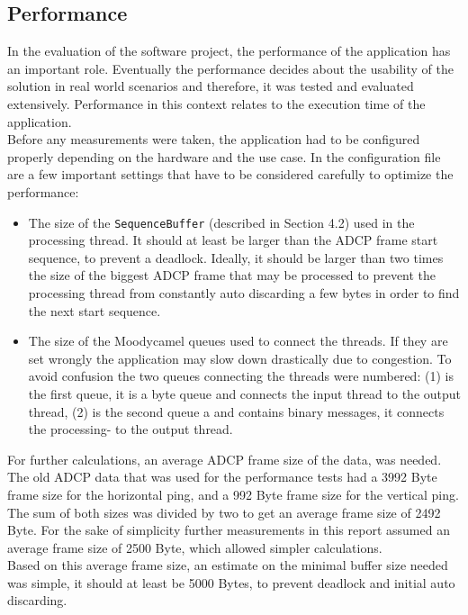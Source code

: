 \subsection{Performance}
In the evaluation of the software project, the performance of the application has an important role. Eventually the performance decides about the usability of the solution in real world scenarios and therefore, it was tested and evaluated extensively. Performance in this context relates to the execution time of the application.\\
Before any measurements were taken, the application had to be configured properly depending on the hardware and the use case. In the configuration file are a few important settings that have to be considered carefully to optimize the performance:
\begin{itemize}
\item The size of the \texttt{SequenceBuffer} (described in Section 4.2) used in the processing thread. It should at least be larger than the ADCP frame start sequence, to prevent a deadlock. Ideally, it should be larger than two times the size of the biggest ADCP frame that may be processed to prevent the processing thread from constantly auto discarding a few bytes in order to find the next start sequence.
\item The size of the Moodycamel queues used to connect the threads. If they are set wrongly the application may slow down drastically due to congestion. To avoid confusion the two queues connecting the threads were numbered: (1) is the first queue, it is a byte queue and connects the input thread to the output thread, (2) is the second queue a and contains binary messages, it connects the processing- to the output thread.
\end{itemize}

For further calculations, an average ADCP frame size of the data, was needed. The old ADCP data that was used for the performance tests had a 3992 Byte frame size for the horizontal ping, and a 992 Byte frame size for the vertical ping. The sum of both sizes was divided by two to get an average frame size of 2492 Byte. For the sake of simplicity further measurements in this report assumed an average frame size of 2500 Byte, which allowed simpler calculations.\\
Based on this average frame size, an estimate on the minimal buffer size needed was simple, it should at least be 5000 Bytes, to prevent deadlock and initial auto discarding.

